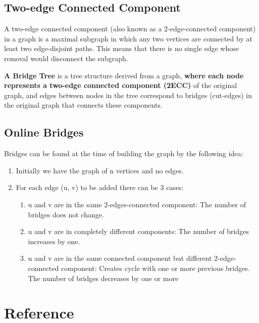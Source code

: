\documentclass{article}
\begin{document}
\subsection{Two-edge Connected Component}
A two-edge connected component (also known as a 2-edge-connected component) in a graph is a maximal subgraph in which any two vertices are connected by at least two edge-disjoint paths. This means that there is no single edge whose removal would disconnect the subgraph.

\textbf{A Bridge Tree} is a tree structure derived from a graph, \textbf{where each node represents a two-edge connected component (2ECC)} of the original graph, and edges between nodes in the tree correspond to bridges (cut-edges) in the original graph that connects these components.

\subsection{Online Bridges}
Bridges can be found at the time of building the graph by the following idea:

\begin{enumerate}[$\bullet$]
    \item Initially we have the graph of n vertices and no edges.
    \item For each edge (u, v) to be added there can be 3 cases:
    \begin{enumerate}
        \item u and v are in the same 2-edges-connected component: The number of bridges does not change.
        \item u and v are in completely different components: The number of bridges increases by one.
        \item u and v are in the same connected component but different 2-edge-connected component: Creates cycle with one or more previous bridges. The number of bridges decreases by one or more
    \end{enumerate}
\end{enumerate}

\section{Reference}
\end{document}
